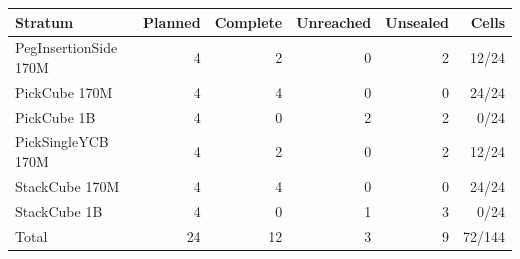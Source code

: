 \begin{tabular}{lrrrrr}
\toprule
Stratum & Planned & Complete & Unreached & Unsealed & Cells \\
\midrule
PegInsertionSide 170M & 4 & 2 & 0 & 2 & 12/24 \\
PickCube 170M & 4 & 4 & 0 & 0 & 24/24 \\
PickCube 1B & 4 & 0 & 2 & 2 & 0/24 \\
PickSingleYCB 170M & 4 & 2 & 0 & 2 & 12/24 \\
StackCube 170M & 4 & 4 & 0 & 0 & 24/24 \\
StackCube 1B & 4 & 0 & 1 & 3 & 0/24 \\
\midrule
Total & 24 & 12 & 3 & 9 & 72/144 \\
\bottomrule
\end{tabular}
